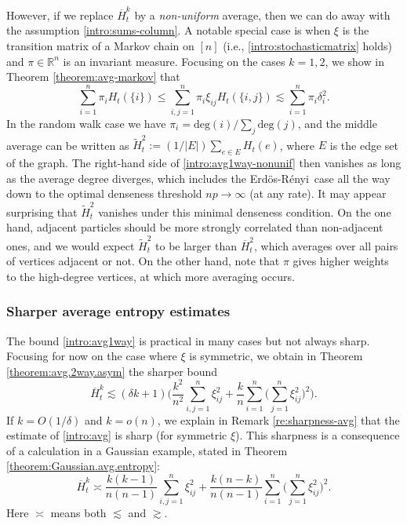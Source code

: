 \documentclass[11pt,reqno]{amsart}
\numberwithin{equation}{section}
\theoremstyle{definition}
\def\R{{\mathbb R}}
\newcommand{\Erdos}{Erd\"{o}s-R\'enyi}
\begin{document}
However, if we replace $\overline{H}^k_t$ by a \emph{non-uniform} average, then we can do away with the assumption \eqref{intro:sums-column}. A notable special case is when $\xi$ is the transition matrix of a Markov chain on $[n]$ (i.e., \eqref{intro:stochasticmatrix} holds) and $\pi \in \R^n$ is an invariant measure.  Focusing on the cases $k=1,2$, we show in Theorem \ref{theorem:avg-markov} that
\begin{equation}
\sum_{i=1}^n \pi_i H_t(\{i\}) \le \sum_{i,j=1}^n \pi_i \xi_{ij} H_t(\{i,j\}) \lesssim  \sum_{i=1}^n \pi_i\delta_i^2. \label{intro:avg1way-nonunif}
\end{equation}
In the random walk case we have $\pi_i=\mathrm{deg}(i)/\sum_j\mathrm{deg}(j)$, and the middle average can be written as $\widetilde{H}^2_t:=(1/|E|)\sum_{e \in E} H_t(e)$, where $E$ is the edge set of the graph. The right-hand side of \eqref{intro:avg1way-nonunif} then vanishes as long as the average degree diverges, which includes the \Erdos \ case all the way down to the optimal denseness threshold $np \to \infty$ (at any rate).  It may appear surprising that $\widetilde{H}^2_t$ vanishes under this minimal denseness condition. On the one hand, adjacent particles should be more strongly correlated than non-adjacent ones, and we would expect $\widetilde{H}^2_t$ to be  larger than $\overline{H}^2_t$, which averages over all pairs of vertices adjacent or not. On the other hand, note that $\pi$ gives higher weights to the high-degree vertices, at which more averaging occurs.






\subsubsection{Sharper average entropy estimates} 
The bound \eqref{intro:avg1way} is practical in many cases but not always sharp. Focusing for now on the case where $\xi$ is symmetric, we obtain in Theorem \ref{theorem:avg.2way.asym} the sharper bound
\begin{equation}
\overline{H}^k_t  \lesssim (\delta k + 1)\bigg(\frac{k^2}{n^2}\sum_{i,j=1}^n \xi_{ij}^2 + \frac{k}{n}\sum_{i=1}^n\Big(\sum_{j=1}^n\xi_{ij}^2\Big)^2 \bigg). \label{intro:avg}
\end{equation}
If $k=O(1/\delta)$ and $k = o(n)$, we explain in Remark \ref{re:sharpness-avg} that the estimate of \eqref{intro:avg} is sharp (for symmetric $\xi$). This sharpness is a consequence of a calculation in a Gaussian example, stated in Theorem \ref{theorem:Gaussian.avg.entropy}: 
\begin{equation}
\overline{H}^k_t \asymp \frac{k(k-1)}{n(n-1)}\sum_{i,j=1}^n  \xi_{ij}^2 + \frac{k (n - k)}{n (n - 1)}\sum_{i=1}^n \bigg(\sum_{j=1}^n  \xi_{ij}^2 \bigg)^2. \label{intro:Gaussian-avg}
\end{equation}
Here $\asymp$ means both $\lesssim$ and $\gtrsim$. 
\end{document}
